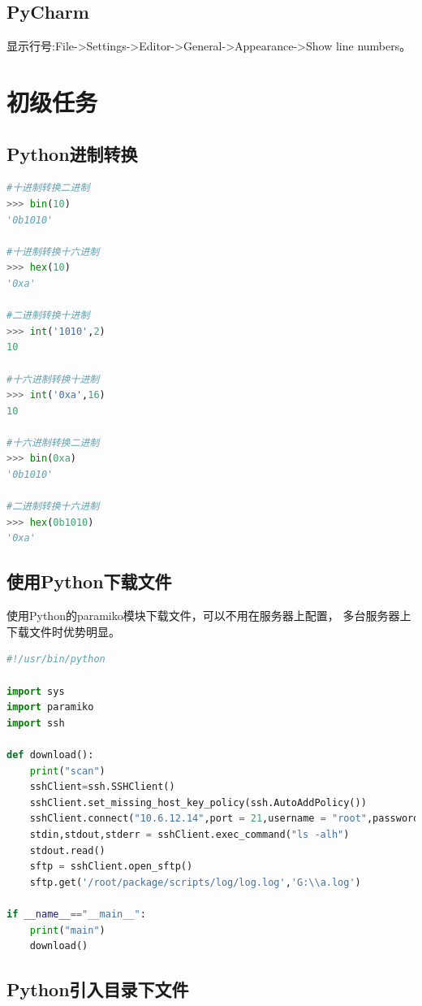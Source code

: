 \documentclass{book}
\begin{document}
\subsection{PyCharm}

显示行号:File->Settings->Editor->General->Appearance->Show line numbers。

\section{初级任务}

\subsection{Python进制转换}

\begin{lstlisting}[language=Python]
#十进制转换二进制 
>>> bin(10) 
'0b1010' 

#十进制转换十六进制 
>>> hex(10) 
'0xa' 

#二进制转换十进制 
>>> int('1010',2) 
10 

#十六进制转换十进制 
>>> int('0xa',16) 
10 

#十六进制转换二进制 
>>> bin(0xa) 
'0b1010' 

#二进制转换十六进制 
>>> hex(0b1010) 
'0xa' 
\end{lstlisting}

\subsection{使用Python下载文件}

使用Python的paramiko模块下载文件，可以不用在服务器上配置，
多台服务器上下载文件时优势明显。

\begin{lstlisting}[language=Python]
#!/usr/bin/python

import sys
import paramiko
import ssh

def download():
	print("scan")
	sshClient=ssh.SSHClient()
	sshClient.set_missing_host_key_policy(ssh.AutoAddPolicy())
	sshClient.connect("10.6.12.14",port = 21,username = "root",password = "123456")
	stdin,stdout,stderr = sshClient.exec_command("ls -alh")
	stdout.read()
	sftp = sshClient.open_sftp()
	sftp.get('/root/package/scripts/log/log.log','G:\\a.log')

if __name__=="__main__":
	print("main")
	download()
\end{lstlisting}

\subsection{Python引入目录下文件}
\end{document}
